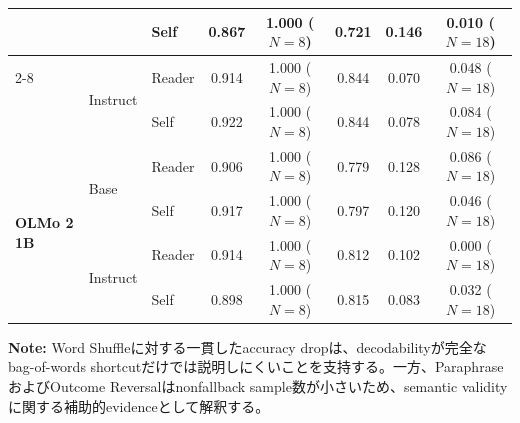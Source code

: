 \begin{table}[htbp]
\begin{tabular}{lll ccccc}
                                 &                    & Self     & 0.867        & 1.000 ($N=8$)            & 0.721        & 0.146        & 0.010 ($N=18$)           \\
\cmidrule(lr){2-8}
                                 & \multirow{2}{*}{Instruct} & Reader   & 0.914        & 1.000 ($N=8$)            & 0.844        & 0.070        & 0.048 ($N=18$)           \\
                                 &                    & Self     & 0.922        & 1.000 ($N=8$)            & 0.844        & 0.078        & 0.084 ($N=18$)           \\
\midrule
\multirow{4}{*}{\textbf{OLMo 2 1B}} & \multirow{2}{*}{Base} & Reader   & 0.906        & 1.000 ($N=8$)            & 0.779        & 0.128        & 0.086 ($N=18$)           \\
                                 &                    & Self     & 0.917        & 1.000 ($N=8$)            & 0.797        & 0.120        & 0.046 ($N=18$)           \\
\cmidrule(lr){2-8}
                                 & \multirow{2}{*}{Instruct} & Reader   & 0.914        & 1.000 ($N=8$)            & 0.812        & 0.102        & 0.000 ($N=18$)           \\
                                 &                    & Self     & 0.898        & 1.000 ($N=8$)            & 0.815        & 0.083        & 0.032 ($N=18$)           \\
\bottomrule
\end{tabular}
\vspace{1ex}
\begin{minipage}{\linewidth}
\footnotesize
\textbf{Note:} Word Shuffleに対する一貫したaccuracy dropは、decodabilityが完全なbag-of-words shortcutだけでは説明しにくいことを支持する。一方、ParaphraseおよびOutcome Reversalはnonfallback sample数が小さいため、semantic validityに関する補助的evidenceとして解釈する。
\end{minipage}
\end{table}

